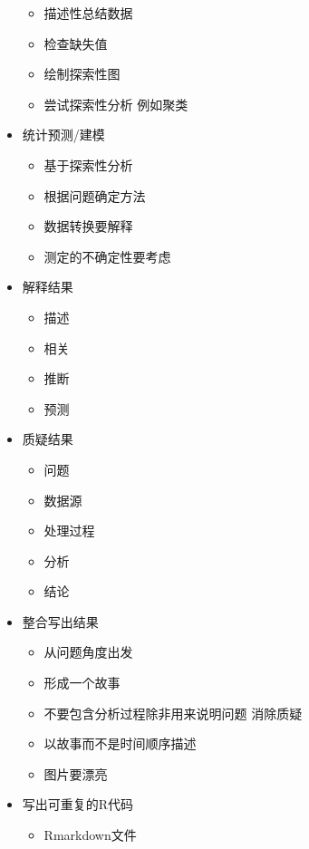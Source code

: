 \documentclass[]{book}
\providecommand{\tightlist}{%
  \setlength{\itemsep}{0pt}\setlength{\parskip}{0pt}}
\begin{document}
\begin{itemize}
  \begin{itemize}
  \tightlist
  \item
    描述性总结数据
  \item
    检查缺失值
  \item
    绘制探索性图
  \item
    尝试探索性分析 例如聚类
  \end{itemize}
\item
  统计预测/建模

  \begin{itemize}
  \tightlist
  \item
    基于探索性分析
  \item
    根据问题确定方法
  \item
    数据转换要解释
  \item
    测定的不确定性要考虑
  \end{itemize}
\item
  解释结果

  \begin{itemize}
  \tightlist
  \item
    描述
  \item
    相关
  \item
    推断
  \item
    预测
  \end{itemize}
\item
  质疑结果

  \begin{itemize}
  \tightlist
  \item
    问题
  \item
    数据源
  \item
    处理过程
  \item
    分析
  \item
    结论
  \end{itemize}
\item
  整合写出结果

  \begin{itemize}
  \tightlist
  \item
    从问题角度出发
  \item
    形成一个故事
  \item
    不要包含分析过程除非用来说明问题 消除质疑
  \item
    以故事而不是时间顺序描述
  \item
    图片要漂亮
  \end{itemize}
\item
  写出可重复的R代码

  \begin{itemize}
  \tightlist
  \item
    Rmarkdown文件
  \end{itemize}
\end{itemize}
\end{document}
